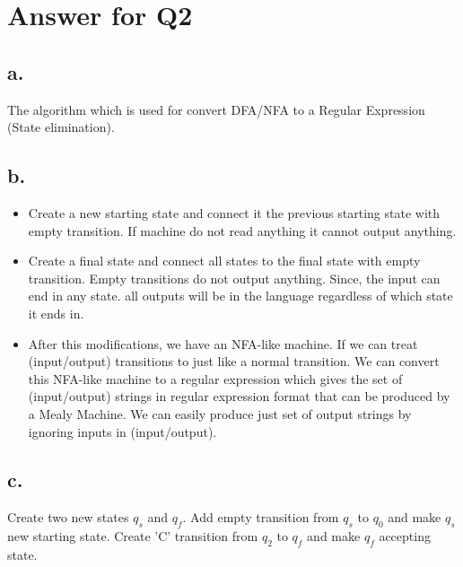 \documentclass[12pt]{article}
\begin{document}
\section*{Answer for Q2}
\subsection*{a.} 
The algorithm which is used for convert DFA/NFA to a Regular Expression (State elimination).
 \subsection*{b.} 
 \begin{itemize}
     \item Create a new starting state and connect it the previous starting state with empty transition. If machine do not read anything it cannot output anything.
     \item Create a final state and connect all states to the final state with empty transition. Empty transitions do not output anything. Since, the input can end in any state. all outputs will be in the language regardless of which state it ends in.
     \item After this modifications, we have an NFA-like machine. If we can treat (input/output) transitions to just like a normal transition. We can convert this NFA-like machine to a regular expression which gives the set of (input/output) strings in regular expression format that can be produced by a Mealy Machine. We can easily produce just set of output strings by ignoring inputs in (input/output).
 \end{itemize}

 \subsection*{c.} 
 Create two new states $q_s$ and $q_f$. Add empty transition from $q_s$ to $q_0$ and make $q_s$ new starting state. Create 'C' transition from $q_2$ to $q_f$ and make $q_f$ accepting state. \\
\end{document}
